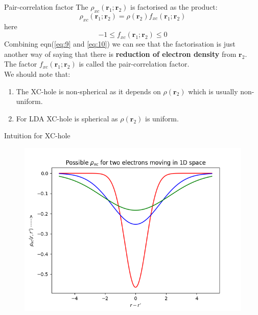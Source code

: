 \documentclass{beamer}
\begin{document}
	\begin{frame}[t]{Pair-correlation factor}
	The $\rho_{xc}(\textbf{r}_1;\textbf{r}_2)$ is factorised as the product:
	\begin{equation}\label{eq:9}
	\rho_{xc}(\textbf{r}_1;\textbf{r}_2) = \rho(\textbf{r}_2)f_{xc}(\textbf{r}_1;\textbf{r}_2)
	\end{equation}
	here 
	\begin{equation}\label{eq:10}
	-1\leqslant f_{xc}(\textbf{r}_1;\textbf{r}_2) \leqslant 0
	\end{equation}
	Combining eqn(\ref{eq:9} and \ref{eq:10}) we can see that the factorisation is just another way of saying that there is \textbf{reduction of electron density} from $\textbf{r}_2$. The factor $f_{xc}(\textbf{r}_1;\textbf{r}_2)$ is called the pair-correlation factor.\\
	We should note that:
	\begin{enumerate}
	\item{The XC-hole is non-spherical as it depends on $\rho(\textbf{r}_2)$ which is usually non-uniform.}
	\item{For LDA XC-hole is spherical as $\rho(\textbf{r}_2)$ is uniform.}
	\end{enumerate}
	\end{frame}
	
	\begin{frame}[t]{Intuition for XC-hole}
	\begin{figure}
	\centering
	\includegraphics[scale=0.65]{nxc.png}
	\end{figure}
	\end{frame}		
	
\end{document}
